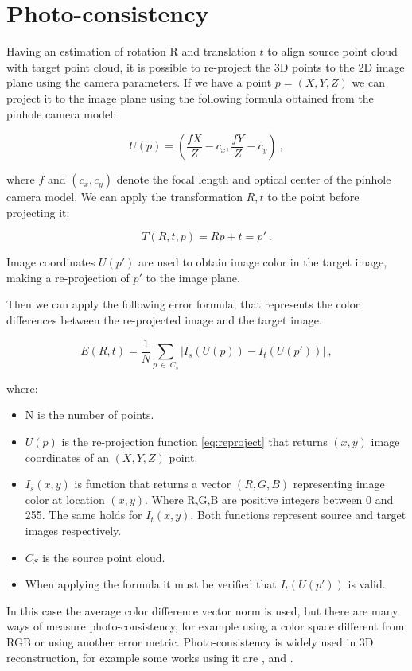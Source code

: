 \section{Photo-consistency}
\label{sec:photocons}

Having an estimation of rotation R and translation $t$ to align source point cloud with target point cloud, 
it is possible to re-project the 3D points to the 2D image plane using the 
camera parameters. If we have a point $p=(X,Y,Z)$ we can project it to the image plane using the following formula obtained 
from the pinhole camera model:

\begin{equation}
U(p) = (\frac{fX}{Z} - c_x, \frac{fY}{Z} - c_y) \ ,
\label{eq:reproject}
\end{equation}

\noindent where $f$ and $(c_x,c_y)$ denote the focal length and optical center of the pinhole camera model. 
We can apply the transformation $R,t$ to the point before projecting it:

\begin{equation}
T(R,t,p) = Rp + t = p' \ .
\end{equation}

\noindent Image coordinates  $U(p')$ are used to obtain image color in the target image, making a re-projection of $p'$ to the image plane.

Then we can apply the following error formula, that represents the color differences between the re-projected image and 
the target image. 

\begin{equation}
E(R,t) = \frac{1}{N} \sum\limits_{p\ \in\ C_s} |I_s(U(p)) - I_t(U(p'))| \ ,
\end{equation}


\noindent where:
\begin{itemize}
\item N is the number of points.
\item $U(p)$ is the re-projection function \ref{eq:reproject} that returns $(x,y)$ image coordinates of an $(X,Y,Z)$ point.
\item  $I_s(x,y)$ is function that returns a vector $(R,G,B)$ representing image color at location $(x,y)$. Where 
R,G,B are positive integers between 0 and 255. The same holds for $I_t(x,y)$. Both functions represent 
source and target images respectively.
\item $C_S$ is the source point cloud.
\item When applying the formula it must be verified that $I_t(U(p'))$ is valid.
\end{itemize}

In this case the average color difference vector norm is used, but there are many ways of measure photo-consistency, 
for example using a color space different from RGB or using another error metric. Photo-consistency is widely used in 3D reconstruction, for example some works using it are \cite{Whelan13},\cite{kerl13icra} and \cite{Newcombe10livedense}.

